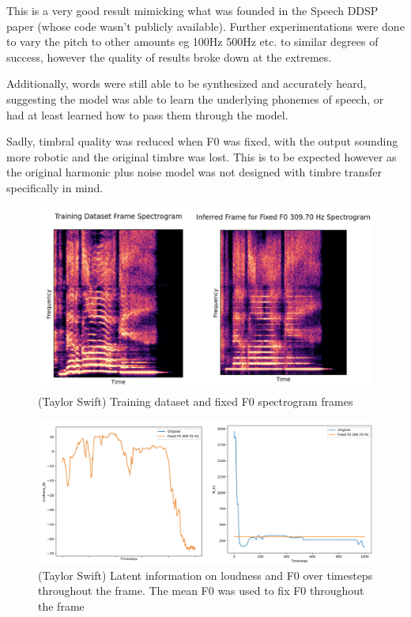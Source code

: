 This is a very good result mimicking what was founded in the Speech DDSP paper\cite{SpeechDDSP} (whose code wasn't publicly available). Further experimentations were done to vary the pitch to other amounts eg 100Hz 500Hz etc. to similar degrees of success, however the quality of results broke down at the extremes.

Additionally, words were still able to be synthesized and accurately heard, suggesting the model was able to learn the underlying phonemes of speech, or had at least learned how to pass them through the model.

Sadly, timbral quality was reduced when F0 was fixed, with the output sounding more robotic and the original timbre was lost. This is to be expected however as the original harmonic plus noise model was not designed with timbre transfer specifically in mind\cite{OriginalDDSP}.

\begin{figure}
    \centering
    \includegraphics[width=\textwidth]{research/results/TaylorSwift/FixedF0.png}
    \caption{(Taylor Swift) Training dataset and fixed F0 spectrogram frames}
\end{figure}

\begin{figure}
    \centering
    \includegraphics[width=\textwidth]{research/results/TaylorSwift/FixedF0Graphs.png}
    \caption{(Taylor Swift) Latent information on loudness and F0 over timesteps throughout the frame. The mean F0 was used to fix F0 throughout the frame}
\end{figure}